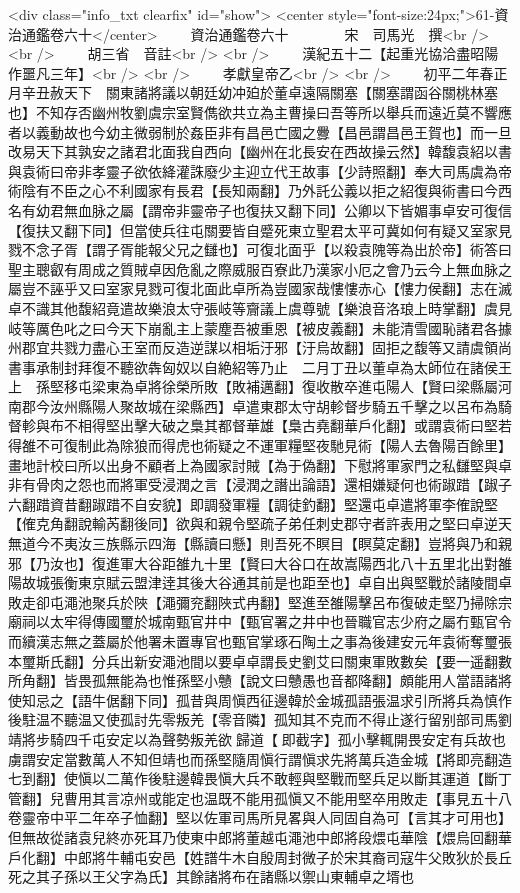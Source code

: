 <div class="info_txt clearfix" id="show">
<center style="font-size:24px;">61-資治通鑑卷六十</center>
  　　資治通鑑卷六十　　　　宋　司馬光　撰<br />
<br />
　　胡三省　音註<br />
<br />
　　漢紀五十二【起重光協洽盡昭陽作噩凡三年】<br />
<br />
　　孝獻皇帝乙<br />
<br />
　　初平二年春正月辛丑赦天下　關東諸將議以朝廷幼冲廹於董卓遠隔關塞【關塞謂函谷關桃林塞也】不知存否幽州牧劉虞宗室賢儁欲共立為主曹操曰吾等所以舉兵而遠近莫不響應者以義動故也今幼主微弱制於姦臣非有昌邑亡國之釁【昌邑謂昌邑王賀也】而一旦改易天下其孰安之諸君北面我自西向【幽州在北長安在西故操云然】韓馥袁紹以書與袁術曰帝非孝靈子欲依絳灌誅廢少主迎立代王故事【少詩照翻】奉大司馬虞為帝術陰有不臣之心不利國家有長君【長知兩翻】乃外託公義以拒之紹復與術書曰今西名有幼君無血脉之屬【謂帝非靈帝子也復扶又翻下同】公卿以下皆媚事卓安可復信【復扶又翻下同】但當使兵往屯關要皆自蹙死東立聖君太平可冀如何有疑又室家見戮不念子胥【謂子胥能報父兄之讎也】可復北面乎【以殺袁隗等為出於帝】術答曰聖主聰叡有周成之質賊卓因危亂之際威服百寮此乃漢家小厄之會乃云今上無血脉之屬豈不誣乎又曰室家見戮可復北面此卓所為豈國家哉慺慺赤心【慺力侯翻】志在滅卓不識其他馥紹竟遣故樂浪太守張岐等齎議上虞尊號【樂浪音洛琅上時掌翻】虞見岐等厲色叱之曰今天下崩亂主上蒙塵吾被重恩【被皮義翻】未能清雪國恥諸君各據州郡宜共戮力盡心王室而反造逆謀以相垢汙邪【汙烏故翻】固拒之馥等又請虞領尚書事承制封拜復不聽欲犇匈奴以自絶紹等乃止　二月丁丑以董卓為太師位在諸侯王上　孫堅移屯梁東為卓將徐榮所敗【敗補邁翻】復收散卒進屯陽人【賢曰梁縣屬河南郡今汝州縣陽人聚故城在梁縣西】卓遣東郡太守胡軫督步騎五千擊之以呂布為騎督軫與布不相得堅出擊大破之梟其都督華雄【梟古堯翻華戶化翻】或謂袁術曰堅若得雒不可復制此為除狼而得虎也術疑之不運軍糧堅夜馳見術【陽人去魯陽百餘里】畫地計校曰所以出身不顧者上為國家討賊【為于偽翻】下慰將軍家門之私讎堅與卓非有骨肉之怨也而將軍受浸潤之言【浸潤之譖出論語】還相嫌疑何也術踧踖【踧子六翻踖資昔翻踧踖不自安貌】即調發軍糧【調徒釣翻】堅還屯卓遣將軍李傕說堅【傕克角翻說輸芮翻後同】欲與和親令堅疏子弟任刺史郡守者許表用之堅曰卓逆天無道今不夷汝三族縣示四海【縣讀曰懸】則吾死不瞑目【瞑莫定翻】豈將與乃和親邪【乃汝也】復進軍大谷距雒九十里【賢曰大谷口在故嵩陽西北八十五里北出對雒陽故城張衡東京賦云盟津逹其後大谷通其前是也距至也】卓自出與堅戰於諸陵間卓敗走卻屯澠池聚兵於陜【澠彌兖翻陜式冉翻】堅進至雒陽擊呂布復破走堅乃掃除宗廟祠以太牢得傳國璽於城南甄官井中【甄官署之井中也晉職官志少府之屬冇甄官令而續漢志無之蓋屬於他署未置專官也甄官掌琢石陶土之事為後建安元年袁術奪璽張本璽斯氏翻】分兵出新安澠池間以要卓卓謂長史劉艾曰關東軍敗數矣【要一遥翻數所角翻】皆畏孤無能為也惟孫堅小戇【說文曰戇愚也音都降翻】頗能用人當語諸將使知忌之【語牛倨翻下同】孤昔與周愼西征邊韓於金城孤語張温求引所將兵為慎作後駐温不聽温又使孤討先零叛羌【零音隣】孤知其不克而不得止遂行留别部司馬劉靖將步騎四千屯安定以為聲勢叛羌欲歸道【即截字】孤小擊輒開畏安定有兵故也虜謂安定當數萬人不知但靖也而孫堅隨周愼行謂愼求先將萬兵造金城【將即亮翻造七到翻】使愼以二萬作後駐邊韓畏愼大兵不敢輕與堅戰而堅兵足以斷其運道【斷丁管翻】兒曹用其言凉州或能定也温既不能用孤愼又不能用堅卒用敗走【事見五十八卷靈帝中平二年卒子恤翻】堅以佐軍司馬所見畧與人同固自為可【言其才可用也】但無故從諸袁兒終亦死耳乃使東中郎將董越屯澠池中郎將段煨屯華陰【煨烏回翻華戶化翻】中郎將牛輔屯安邑【姓譜牛木自殷周封微子於宋其裔司寇牛父敗狄於長丘死之其子孫以王父字為氏】其餘諸將布在諸縣以禦山東輔卓之壻也